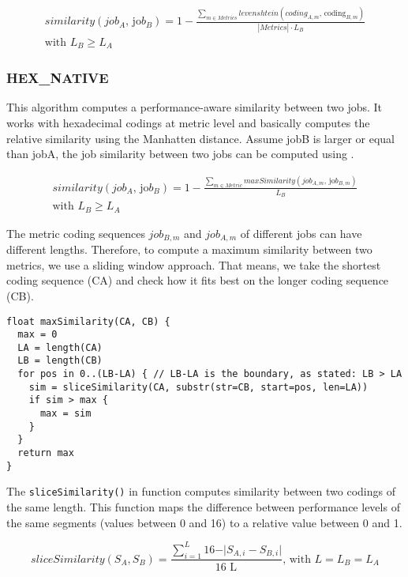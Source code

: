 \documentclass{jhps}
\begin{document}
\begin{multline}
  similarity \left( job_{A}\text{, jo}b_{B} \right) = 1 -\frac{ \sum_{m \in Metrics}^{} levenshtein \left( coding_{A,m}\text{, coding}_{B,m} \right) }{|Metrics| \cdot L_{B}} \\
	\text{with } L_{B} \geq L_{A}
\end{multline}

\subsubsection{HEX\_NATIVE}
This algorithm computes a performance-aware similarity between two jobs.
It works with hexadecimal codings at metric level and basically computes the relative similarity using the Manhatten distance.
Assume jobB is larger or equal than jobA, the job similarity between two jobs can be computed using .

\begin{multline}
similarity \left( job_{A}\text{, jo}b_{B} \right) = 1-\frac{ \sum _{m \in Metric}^{}maxSimilarity \left( job_{A,m}\text{, jo}b_{B,m} \right) }{L_{B}}\\
\text{with }L_{B} \geq L_{A} \label{eq:hexn}
\end{multline}

The metric coding sequences $job_{B,m}$ and $job_{A,m}$ of different jobs can have different lengths.
Therefore, to compute a maximum similarity between two metrics, we use a sliding window approach.
That means, we take the shortest coding sequence (CA) and check how it fits best on the longer coding sequence (CB).


\begin{lstlisting}
float maxSimilarity(CA, CB) {
  max = 0
  LA = length(CA)
  LB = length(CB)
  for pos in 0..(LB-LA) { // LB-LA is the boundary, as stated: LB > LA
    sim = sliceSimilarity(CA, substr(str=CB, start=pos, len=LA))
    if sim > max {
      max = sim
    }
  }
  return max
}
\end{lstlisting}

The \texttt{sliceSimilarity()} in  function computes similarity between two codings of the same length.
This function maps the difference between performance levels of the same segments (values between 0 and 16) to a relative value between 0 and 1.

\begin{equation}
sliceSimilarity \left( S_{A},S_{B} \right) =\frac{ \sum _{i=1}^{L_{}}16 - \vert S_{A,i}-S_{B,i} \vert }{\text{16 L}_{}}\text{, with }L=L_{B}=L_{A} \label{eq:slicesim}
\end{equation}
\end{document}
